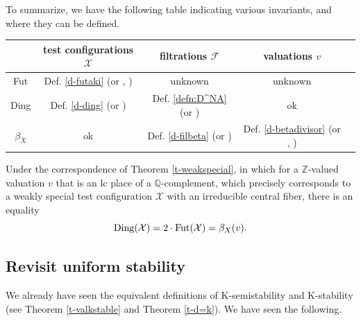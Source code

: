 \documentclass[12pt,reqno]{amsart}%
\newcommand{\bZ}{{\mathbb{Z} }}
\newcommand{\cX}{{\mathcal{X}}}
\newcommand{\cF}{\mathcal{F}}
\theoremstyle{definition}
\theoremstyle{remark}
\newcommand{\Fut}{{\rm Fut}}
\newcommand{\Ding}{{\rm Ding}}
\newcommand{\vol}{{\rm vol}}
\newcommand{\fa}{{\mathfrak{a}}}
\newcommand{\lct}{{\rm lct}}
\newcommand{\bQ}{{\mathbb{Q}}}
\begin{document}
\bigskip

To summarize, we have the following table indicating various invariants, and where they can be defined.  

\vspace{0.1cm}

{\small

\begin{center}
\begin{tabular}{ | c | c | c | c | c |   }
 \hline
           & test configurations  $\cX$  & filtrations $\cF$ & valuations $v$ \\
 \hline          
\Fut     & Def. \ref{d-futaki} (or \cite{Tia97}, \cite{Don02}) & unknown & unknown \\
 \hline
\Ding   & Def. \ref{d-ding} (or \cite{Ber16}) & Def. \ref{defn:D^NA} (or \cite{Fuj18}) & ok \\
 \hline
$\beta_X$   & ok & Def. \ref{d-filbeta} (or \cite{XZ19}) &Def. \ref{d-betadivisor} (or \cite{Fuj19b}, \cite{Li17}) \\
 \hline
\end{tabular}
\end{center}

}

\medskip

Under the correspondence of Theorem \ref{t-weakspecial}, in which for a $\bZ$-valued valuation $v$ that is an lc place of a $\bQ$-complement, which precisely corresponds to a weakly special test configuration $\cX$ with an irreducible central fiber, there is an equality
$$\Ding(\cX)=2\cdot \Fut(\cX)=\beta_X(v) .$$ 





\subsection{Revisit uniform stability}
  We already have seen the equivalent definitions of K-semistability and K-stability (see Theorem \ref{t-valkstable} and Theorem \ref{t-d=k}).  We have seen the following.
\end{document}
